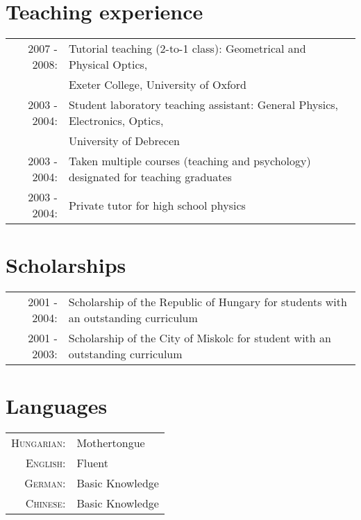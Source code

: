\documentclass[10pt]{article}
\begin{document}
\section{Teaching experience}
\begin{tabular}{rl}
\textsc{2007 - 2008:} & Tutorial teaching (2-to-1 class): Geometrical and Physical Optics,\\& Exeter College, University of Oxford \\
\textsc{2003 - 2004:} & Student laboratory teaching assistant: General Physics, Electronics, Optics,\\& University of Debrecen \\
\textsc{2003 - 2004:} & Taken multiple courses (teaching and psychology) designated for teaching graduates \\
\textsc{2003 - 2004:} & Private tutor for high school physics
\end{tabular}

\section{Scholarships}
\begin{tabular}{rl}
\textsc{2001 - 2004:} & Scholarship of the Republic of Hungary for students with an outstanding curriculum\\
\textsc{2001 - 2003:} & Scholarship of the City of Miskolc for student with an outstanding curriculum
\end{tabular}

\section{Languages}
\begin{tabular}{rl}
\textsc{Hungarian:}&Mothertongue\\
\textsc{English:}&Fluent\\
\textsc{German:}&Basic Knowledge\\
\textsc{Chinese:}&Basic Knowledge\\
\end{tabular}

\newpage
\thispagestyle{empty}



\end{document}
